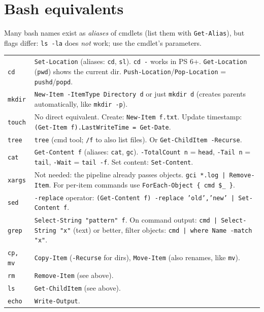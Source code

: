 \section{Bash equivalents}

Many bash names exist as \emph{aliases} of cmdlets (list them with \texttt{Get-Alias}), but flags differ: \texttt{ls -la} does \emph{not} work; use the cmdlet's parameters.\\

\begin{tabularx}{\linewidth}{lX}
    \texttt{cd} & \texttt{Set-Location} (aliases: \texttt{cd}, \texttt{sl}). \texttt{cd -} works in PS 6+. \texttt{Get-Location} (\texttt{pwd}) shows the current dir. \texttt{Push-Location}/\texttt{Pop-Location} = \texttt{pushd}/\texttt{popd}.\\
    \texttt{mkdir} & \texttt{New-Item -ItemType Directory d} or just \texttt{mkdir d} (creates parents automatically, like \texttt{mkdir -p}).\\
    \texttt{touch} & No direct equivalent. Create: \texttt{New-Item f.txt}. Update timestamp: \texttt{(Get-Item f).LastWriteTime = Get-Date}.\\
    \texttt{tree} & \texttt{tree} (cmd tool; \texttt{/f} to also list files). Or \texttt{Get-ChildItem -Recurse}.\\
    \texttt{cat} & \texttt{Get-Content f} (aliases: \texttt{cat}, \texttt{gc}). \texttt{-TotalCount n} = \texttt{head}, \texttt{-Tail n} = \texttt{tail}, \texttt{-Wait} = \texttt{tail -f}. Set content: \texttt{Set-Content}.\\
    \texttt{xargs} & Not needed: the pipeline already passes objects. \texttt{gci *.log | Remove-Item}. For per-item commands use \texttt{ForEach-Object \{ cmd \$\_ \}}.\\
    \texttt{sed} & \texttt{-replace} operator: \texttt{(Get-Content f) -replace 'old','new' | Set-Content f}.\\
    \texttt{grep} & \texttt{Select-String "pattern" f}. On command output: \texttt{cmd | Select-String "x"} (text) or better, filter objects: \texttt{cmd | where Name -match "x"}.\\
    \hline
    \texttt{cp, mv} & \texttt{Copy-Item} (\texttt{-Recurse} for dirs), \texttt{Move-Item} (also renames, like \texttt{mv}).\\
    \texttt{rm} & \texttt{Remove-Item} (see above).\\
    \texttt{ls} & \texttt{Get-ChildItem} (see above).\\
    \texttt{echo} & \texttt{Write-Output}.\\

\end{tabularx}
